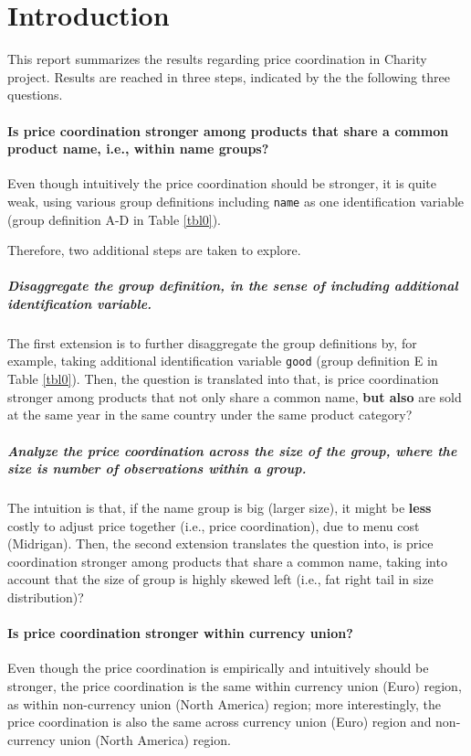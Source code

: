 


\clearpage
\section{Introduction}
This report summarizes the results regarding price coordination in Charity project. Results are reached in three steps, indicated by the the following three questions.

\paragraph{Is price coordination stronger among products that share a common product name, i.e., within name groups?}
Even though intuitively the price coordination should be stronger, it is quite weak, using various group definitions including \texttt{name} as one identification variable (group definition A-D in Table \ref{tbl0}).

Therefore, two additional steps are taken to explore.

\subparagraph{Disaggregate the group definition, in the sense of including additional identification variable.}
The first extension is to further disaggregate the group definitions by, for example, taking additional identification variable \texttt{good} (group definition E in Table \ref{tbl0}). Then, the question is translated into that, is price coordination stronger among products that not only share a common name, \textbf{but also} are sold at the same year in the same country under the same product category?

\subparagraph{Analyze the price coordination across the size of the group, where the size is number of observations within a group.}
The intuition is that, if the name group is big (larger size), it might be \textbf{less} costly to adjust price together (i.e., price coordination), due to menu cost (Midrigan). Then, the second extension translates the question into, is price coordination stronger among products that share a common name, taking into account that the size of group is highly skewed left (i.e., fat right tail in size distribution)?

\paragraph{Is price coordination stronger within currency union?}
Even though the price coordination is empirically and intuitively should be stronger, the price coordination is the same within currency union (Euro) region, as within non-currency union (North America) region; more interestingly, the price coordination is also the same  across currency union (Euro) region and non-currency union (North America) region.

